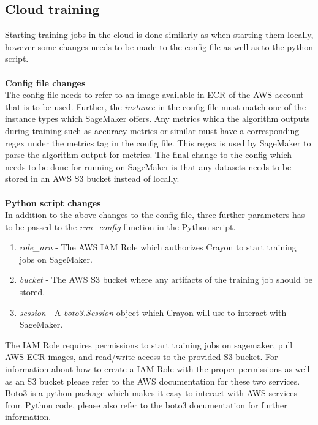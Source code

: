\subsection{Cloud training}
Starting training jobs in the cloud is done similarly as when starting them locally, however some changes needs to be made to the config file as well as to the python script. 
\\
\\
\textbf{Config file changes}
\\
The config file needs to refer to an image available in ECR of the AWS account that is to be used. Further, the \textit{instance} in the config file must match one of the instance types which SageMaker offers. Any metrics which the algorithm outputs during training such as accuracy metrics or similar must have a corresponding regex under the metrics tag in the config file. This regex is used by SageMaker to parse the algorithm output for metrics. The final change to the config which needs to be done for running on SageMaker is that any datasets needs to be stored in an AWS S3 bucket instead of locally. 
\\
\\
\textbf{Python script changes}
\label{sagemaker_requirements}
\\
In addition to the above changes to the config file,  three further parameters has to be passed to the \textit{run\_config} function in the Python script. 

\begin{enumerate}
\item \textit{role\_arn} - The AWS IAM Role  which authorizes Crayon to start training jobs on SageMaker.
\item \textit{bucket} - The AWS S3 bucket where any artifacts of the training job should be stored.
\item \textit{session} - A \textit{boto3.Session} object which Crayon will use to interact with SageMaker. 
\end{enumerate}

 The IAM Role requires permissions to start training jobs on sagemaker, pull AWS ECR images, and read/write access to the provided S3 bucket. For information about how to create a IAM Role with the proper permissions as well as an S3 bucket please refer to the AWS documentation for these two services. Boto3 is a python package which makes it easy to interact with AWS services from Python code, please also refer to the boto3 documentation for further information.

